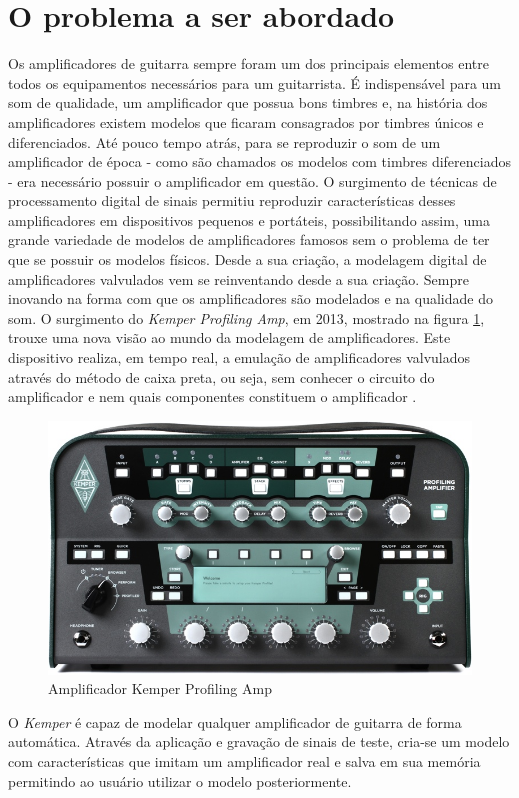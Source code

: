 \section*{O problema a ser abordado}
Os amplificadores de guitarra sempre foram um dos principais elementos entre todos os equipamentos necessários para um guitarrista. É indispensável para um som de qualidade, um amplificador que possua bons timbres e, na história dos amplificadores existem modelos que ficaram consagrados por timbres únicos e diferenciados. Até pouco tempo atrás, para se reproduzir o som de um amplificador de época - como são chamados os modelos com timbres diferenciados - era necessário possuir o amplificador em questão. O surgimento de técnicas de processamento digital de sinais permitiu reproduzir características desses amplificadores em dispositivos pequenos e portáteis, possibilitando assim, uma grande variedade de modelos de amplificadores famosos sem o problema de ter que se possuir os modelos físicos. Desde a sua criação, a modelagem digital de amplificadores valvulados vem se reinventando desde a sua criação. Sempre inovando na forma com que os amplificadores são modelados e na qualidade do som. O surgimento do \textit{Kemper Profiling Amp}, em 2013, mostrado na figura \ref{fig:profilingampbk-large}, trouxe uma nova visão ao mundo da modelagem de amplificadores. Este dispositivo realiza, em tempo real, a emulação de amplificadores valvulados através do método de caixa preta, ou seja, sem conhecer o circuito do amplificador e nem quais componentes constituem o amplificador \cite{kemper2014musical}.

\begin{figure}[!htb]
	\centering
	\includegraphics[width=0.7\linewidth]{figuras/ProfilingAmpBK-large}
	\caption{Amplificador Kemper Profiling Amp}
	\label{fig:profilingampbk-large}
\end{figure}




O \textit{Kemper} é capaz de modelar qualquer amplificador de guitarra de forma automática. Através da aplicação e gravação de sinais de teste, cria-se um modelo com características que imitam um amplificador real e salva em sua memória permitindo ao usuário utilizar o modelo posteriormente. 

